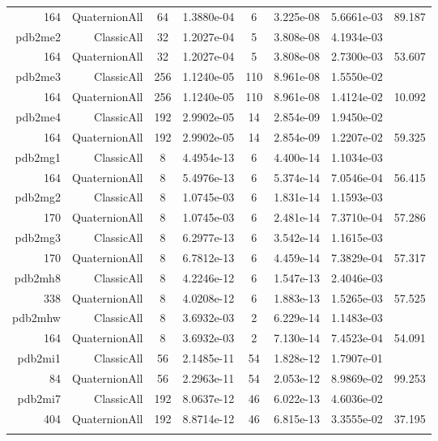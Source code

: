 \begin{xltabular}{\textwidth}{r|rcS[table-format=1.4e+2]cS[table-format=1.3e+2]S[table-format=1.4e+2]S[table-format=-1.3]}
164 & QuaternionAll & 64 & 1.3880e-04 & 6 & 3.225e-08 & 5.6661e-03 & 89.187\\  \addlinespace
pdb2me2 & ClassicAll & 32 & 1.2027e-04 & 5 & 3.808e-08 & 4.1934e-03 & \\
164 & QuaternionAll & 32 & 1.2027e-04 & 5 & 3.808e-08 & 2.7300e-03 & 53.607\\  \addlinespace
pdb2me3 & ClassicAll & 256 & 1.1240e-05 & 110 & 8.961e-08 & 1.5550e-02 & \\
164 & QuaternionAll & 256 & 1.1240e-05 & 110 & 8.961e-08 & 1.4124e-02 & 10.092\\  \addlinespace
pdb2me4 & ClassicAll & 192 & 2.9902e-05 & 14 & 2.854e-09 & 1.9450e-02 & \\
164 & QuaternionAll & 192 & 2.9902e-05 & 14 & 2.854e-09 & 1.2207e-02 & 59.325\\  \addlinespace
pdb2mg1 & ClassicAll & 8 & 4.4954e-13 & 6 & 4.400e-14 & 1.1034e-03 & \\
164 & QuaternionAll & 8 & 5.4976e-13 & 6 & 5.374e-14 & 7.0546e-04 & 56.415\\  \addlinespace
pdb2mg2 & ClassicAll & 8 & 1.0745e-03 & 6 & 1.831e-14 & 1.1593e-03 & \\
170 & QuaternionAll & 8 & 1.0745e-03 & 6 & 2.481e-14 & 7.3710e-04 & 57.286\\  \addlinespace
pdb2mg3 & ClassicAll & 8 & 6.2977e-13 & 6 & 3.542e-14 & 1.1615e-03 & \\
170 & QuaternionAll & 8 & 6.7812e-13 & 6 & 4.459e-14 & 7.3829e-04 & 57.317\\  \addlinespace
pdb2mh8 & ClassicAll & 8 & 4.2246e-12 & 6 & 1.547e-13 & 2.4046e-03 & \\
338 & QuaternionAll & 8 & 4.0208e-12 & 6 & 1.883e-13 & 1.5265e-03 & 57.525\\  \addlinespace
pdb2mhw & ClassicAll & 8 & 3.6932e-03 & 2 & 6.229e-14 & 1.1483e-03 & \\
164 & QuaternionAll & 8 & 3.6932e-03 & 2 & 7.130e-14 & 7.4523e-04 & 54.091\\  \addlinespace
pdb2mi1 & ClassicAll & 56 & 2.1485e-11 & 54 & 1.828e-12 & 1.7907e-01 & \\
84 & QuaternionAll & 56 & 2.2963e-11 & 54 & 2.053e-12 & 8.9869e-02 & 99.253\\  \addlinespace
pdb2mi7 & ClassicAll & 192 & 8.0637e-12 & 46 & 6.022e-13 & 4.6036e-02 & \\
404 & QuaternionAll & 192 & 8.8714e-12 & 46 & 6.815e-13 & 3.3555e-02 & 37.195\\  \addlinespace

\end{xltabular}
